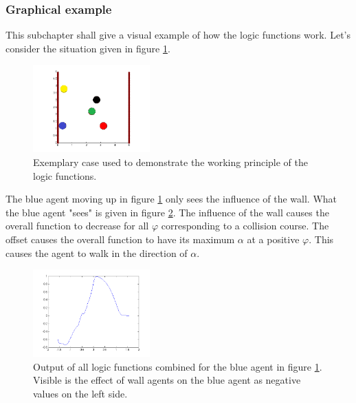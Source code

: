 \subsubsection{Graphical example}
This subchapter shall give a visual example of how the logic functions work. Let's consider the situation given in figure \ref{fig:Bsp1}.
\begin{figure}[h!]
	\centering
		\includegraphics[width=0.40\textwidth]{pictures/Bsp1}
	\caption{Exemplary case used to demonstrate the working principle of the logic functions.}
	\label{fig:Bsp1}
\end{figure}

\noi The blue agent moving up in figure \ref{fig:Bsp1} only sees the influence of the wall. What the blue agent "sees" is given in figure \ref{fig:Bsp1LinksUnten}. The influence of the wall causes the overall function to decrease for all $\varphi$ corresponding to a collision course. The offset causes the overall function to have its maximum $\alpha$ at a positive $\varphi$. This causes the agent to walk in the direction of $\alpha$.\\
\begin{figure}[h!]
	\centering
		\includegraphics[width=0.40\textwidth]{pictures/Bsp1LinksUnten}
	\caption{Output of all logic functions combined for the blue agent in figure \ref{fig:Bsp1}. Visible is the effect of wall agents on the blue agent as negative values on the left side.}
	\label{fig:Bsp1LinksUnten}
\end{figure}

